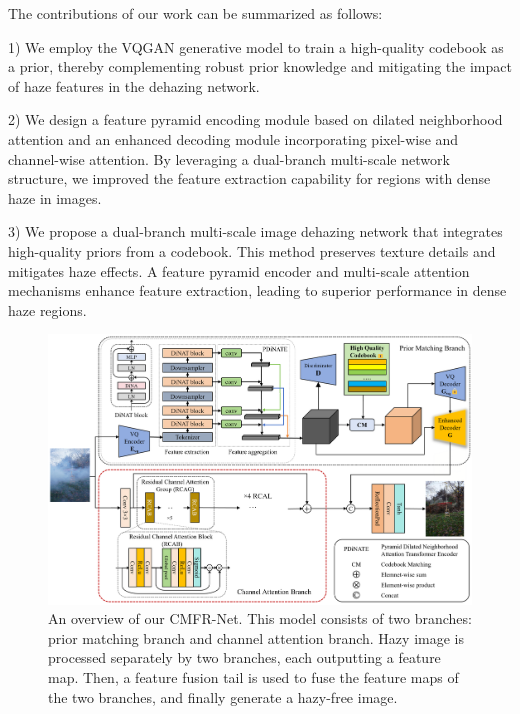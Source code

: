 \documentclass[journal]{IEEEtran}
\begin{document}
The contributions of our work can be summarized as follows:

\begin{list}{}{}
	\item{1) We employ the VQGAN generative model to train a high-quality codebook as a prior, thereby complementing robust prior knowledge and mitigating the impact of haze features in the dehazing network.}

	\item{2) We design a feature pyramid encoding module based on dilated neighborhood attention and an enhanced decoding module incorporating pixel-wise and channel-wise attention. By leveraging a dual-branch multi-scale network structure, we improved the feature extraction capability for regions with dense haze in images.}

	\item{3) We propose a dual-branch multi-scale image dehazing network that integrates high-quality priors from a codebook. This method preserves texture details and mitigates haze effects. A feature pyramid encoder and multi-scale attention mechanisms enhance feature extraction, leading to superior performance in dense haze regions.}
\end{list}

\begin{figure}[!t]
	\centering
	\includegraphics[width=7in]{network_architecture}
	\caption{An overview of our CMFR-Net. This model consists of two branches: prior matching branch and channel attention branch. Hazy image is processed separately by two branches, each outputting a feature map. Then, a feature fusion tail is used to fuse the feature maps of the two branches, and finally generate a hazy-free image.}
	\label{fig0}
\end{figure}
\end{document}
